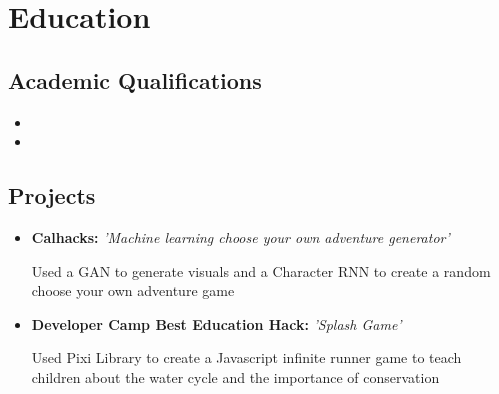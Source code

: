 \documentclass[11pt,letterpaper,sans]{moderncv}        %
\begin{document}
\section{Education}

\vspace{5pt}

\subsection{Academic Qualifications}

\vspace{5pt}

\begin{itemize}

\item{}

\item{}  %


\end{itemize}

\vspace{2pt}

\subsection{Projects}

\vspace{5pt}

\begin{itemize}

\item{\textbf{Calhacks:} \textit{'Machine learning choose your own adventure generator'}

\vspace{3pt}

\small{Used a GAN to generate visuals and a Character RNN to create a random choose your own adventure game}}

\item{\textbf{Developer Camp Best Education Hack:} \textit{'Splash Game'}

\vspace{3pt}

\small{Used Pixi Library to create a Javascript infinite runner game to teach children about the water cycle and the importance of conservation}}

\vspace{6pt}
\end{itemize}
\end{document}
